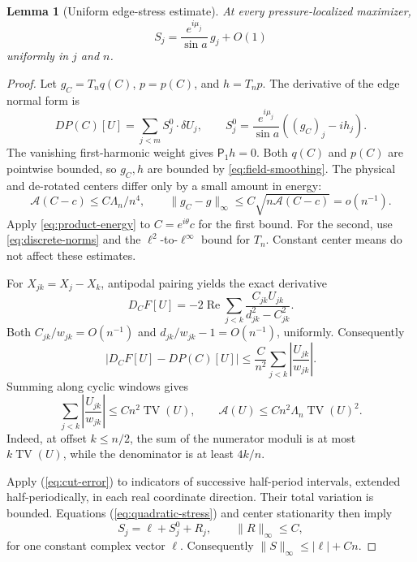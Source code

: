 \documentclass[11pt,reqno]{amsart}
\numberwithin{equation}{section}
\newtheorem{lemma}[theorem]{Lemma}
\theoremstyle{definition}
\theoremstyle{remark}
\newcommand{\A}{\mathcal A}
\newcommand{\norm}[1]{\lVert #1\rVert}
\newcommand{\TV}{\operatorname{TV}}
\newcommand{\Rea}{\operatorname{Re}}
\begin{document}
\begin{lemma}[Uniform edge-stress estimate]\label{lem:stress}
At every pressure-localized maximizer,
\begin{equation}\label{eq:stress-asymptotic}
 S_j=\frac{e^{i\mu_j}}{\sin a}\,g_j+O(1)
\end{equation}
uniformly in $j$ and $n$.
\end{lemma}
\begin{proof}
Let $g_C=T_nq(C)$, $p=p(C)$, and $h=T_np$. The derivative of the edge normal form is
\begin{equation}\label{eq:quadratic-stress}
 DP(C)[U]=\sum_{j<m}S_j^0\cdot\delta U_j,
 \qquad S_j^0=\frac{e^{i\mu_j}}{\sin a}((g_C)_j-ih_j).
\end{equation}
The vanishing first-harmonic weight gives $\mathsf P_1h=0$. Both $q(C)$ and $p(C)$ are pointwise bounded, so $g_C,h$ are bounded by \eqref{eq:field-smoothing}. The physical and de-rotated centers differ only by a small amount in energy:
\begin{equation}\label{eq:center-rotation}
 \A(C-c)\le C\Lambda_n/n^4,\qquad
 \norm{g_C-g}_\infty\le C\sqrt{n\A(C-c)}=o(n^{-1}).
\end{equation}
Apply \eqref{eq:product-energy} to $C=e^{i\theta}c$ for the first bound. For the second, use \eqref{eq:discrete-norms} and the $\ell^2$-to-$\ell^\infty$ bound for $T_n$. Constant center means do not affect these estimates.

For $X_{jk}=X_j-X_k$, antipodal pairing yields the exact derivative
\[
 D_CF[U]=-2\Rea\sum_{j<k}\frac{C_{jk}U_{jk}}{d_{jk}^2-C_{jk}^2}.
\]
Both $C_{jk}/w_{jk}=O(n^{-1})$ and $d_{jk}/w_{jk}-1=O(n^{-1})$, uniformly. Consequently
\begin{equation}\label{eq:cut-error}
 |D_CF[U]-DP(C)[U]|
 \le\frac C{n^2}\sum_{j<k}\left|\frac{U_{jk}}{w_{jk}}\right|.
\end{equation}
Summing along cyclic windows gives
\begin{equation}\label{eq:window-bounds}
 \sum_{j<k}\left|\frac{U_{jk}}{w_{jk}}\right|\le Cn^2\TV(U),
 \qquad \A(U)\le Cn^2\Lambda_n\TV(U)^2.
\end{equation}
Indeed, at offset $k\le n/2$, the sum of the numerator moduli is at most $k\TV(U)$, while the denominator is at least $4k/n$.

Apply (\ref{eq:cut-error}) to indicators of successive half-period intervals, extended half-periodically, in each real coordinate direction. Their total variation is bounded. Equations (\ref{eq:quadratic-stress}) and center stationarity then imply
\begin{equation}\label{eq:stress-constant}
 S_j=\ell+S_j^0+R_j,\qquad \norm R_\infty\le C,
\end{equation}
for one constant complex vector $\ell$. Consequently $\norm S_\infty\le|\ell|+Cn$.


\end{proof}
\end{document}
